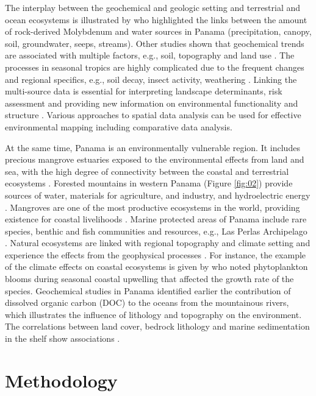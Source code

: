 \documentclass[USenglish,twocolumn]{article}
\begin{document}
The interplay between the geochemical and geologic setting and terrestrial and ocean ecosystems is illustrated by \cite{Gardner} who highlighted the links between the amount of rock-derived Molybdenum and water sources in Panama (precipitation, canopy, soil, groundwater, seeps, streams). Other studies shown that geochemical trends are associated with multiple factors, e.g., soil, topography and land use \cite{Neumann}. The processes in seasonal tropics are highly complicated due to the frequent changes and regional specifics, e.g., soil decay, insect activity, weathering \cite{Niedzialek}. Linking the multi-source data is essential for interpreting landscape determinants, risk assessment and providing new information on environmental functionality and structure \cite{Higgins,Lemenkova202112,Klauco2017}. Various approaches to spatial data analysis can be used for effective environmental mapping including comparative data analysis.

At the same time, Panama is an environmentally vulnerable region. It includes precious mangrove estuaries exposed to the environmental effects from land and sea, with the high degree of connectivity between the coastal and terrestrial ecosystems \cite{Valiela}. Forested mountains in western Panama (Figure \ref{fig:02}) provide sources of water, materials for agriculture, and industry, and hydroelectric energy \cite{Larsen}. Mangroves are one of the most productive ecosystems in the world, providing existence for coastal livelihoods \cite{LopezAngarita}. Marine protected areas of Panama include rare species, benthic and fish communities and resources, e.g., Las Perlas Archipelago \cite{Mair}. Natural ecosystems are linked with regional topography and climate setting and experience the effects from the geophysical processes \cite{Benfield,Lee,Lemenkova202018,Ruane,Lemenkova202206,Klauco2013,Lemenkova202140}. For instance, the example of the climate effects on coastal ecosystems is given by \cite{Sadatzki} who noted phytoplankton blooms during seasonal coastal upwelling that affected the growth rate of the species. Geochemical studies in Panama identified earlier the contribution of dissolved organic carbon (DOC) to the oceans from the mountainous rivers, which illustrates the influence of lithology and topography on the environment. The correlations between land cover, bedrock lithology and marine sedimentation in the shelf show associations \cite{Goldsmith}.

\section{Methodology}
\end{document}
